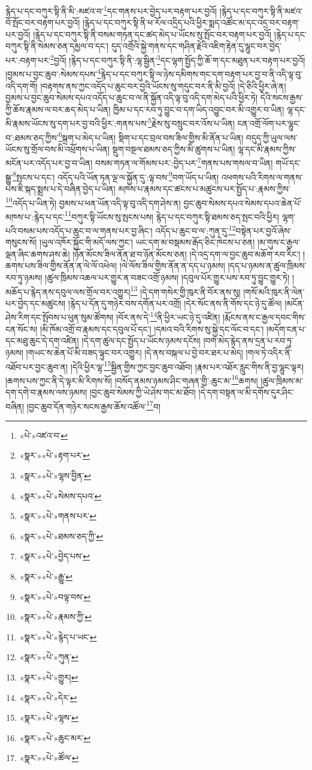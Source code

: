 རྙེད་པ་དང་བཀུར་སྟི་ནི་མི་:མཛའ་བ་\footnote{«པེ་»འཛའ་བ་}དང་གནས་པར་བྱེད་པར་བརྟག་པར་བྱའོ། །རྙེད་པ་དང་བཀུར་སྟི་ནི་མཛའ་བོ་སྤོང་བར་བརྟག་པར་བྱའོ། །རྙེད་པ་དང་བཀུར་སྟི་ནི་ཕ་རོལ་འདྲིད་པའི་ཕྱིར་སྨད་འཚོང་མ་དང་འདྲ་བར་བརྟག་པར་བྱའོ། །རྙེད་པ་དང་བཀུར་སྟི་ནི་བསམ་གཏན་དང་ཚད་མེད་པ་ཡོངས་སུ་སྤོང་བར་བརྟག་པར་བྱའོ། །རྙེད་པ་དང་བཀུར་སྟི་ནི་སེམས་ཅན་དམྱལ་བ་དང་། དུད་འགྲོའི་སྐྱེ་གནས་དང་གཤིན་རྗེའི་འཇིག་རྟེན་དུ་ལྷུང་བར་བྱེད་པར་:བརྟག་པར་\footnote{«སྣར་»«པེ་»རྟག་པར་}བྱའོ། །རྙེད་པ་དང་བཀུར་སྟི་ནི་:ལྷ་སྦྱིན་\footnote{«སྣར་»«པེ་»ལྷས་བྱིན་}དང་ལྷག་སྤྱོད་ཀྱི་ཆོ་ག་དང་མཐུན་པར་བརྟག་པར་བྱའོ། །བྱམས་པ་བྱང་ཆུབ་:སེམས་དཔས་\footnote{«སྣར་»«པེ་»སེམས་དཔའ་}རྙེད་པ་དང་བཀུར་སྟི་ལ་ཉེས་དམིགས་གང་དག་བརྟག་པར་བྱ་བ་ནི་འདི་ལྟ་བུ་འདི་དག་གོ། །བརྟགས་ནས་ཀྱང་འདོད་པ་ཆུང་བར་བྱའི་ཡོངས་སུ་གདུང་བར་ནི་མི་བྱའོ། །དེ་ཅིའི་ཕྱིར་ཞེ་ན། བྱམས་པ་བྱང་ཆུབ་སེམས་དཔའ་འདོད་པ་ཆུང་བ་ལ་ནི་སྐྱོན་འདི་ལྟ་བུ་འདི་དག་མེད་པའི་ཕྱིར་ཏེ། དེའི་སངས་རྒྱས་ཀྱི་ཆོས་རྣམས་ལ་བར་ཆད་མེད་པ་ཡིན། ཁྱིམ་པ་དང་རབ་ཏུ་བྱུང་བ་དག་ཡིད་འབྱུང་བར་མི་འགྱུར་བ་ཡིན། ལྷ་དང་མི་རྣམས་ཡོངས་སུ་དག་པར་བྱ་བའི་ཕྱིར་:གནས་པས་\footnote{«སྣར་»«པེ་»གནས་པར་}རྗེས་སུ་བསྲུང་བར་འོས་པ་ཡིན། ངན་འགྲོ་ལོག་པར་ལྷུང་བ་:ཐམས་ཅད་ཀྱིས་\footnote{«སྣར་»«པེ་»ཐམས་ཅད་ཀྱི་}སྐྲག་པ་མེད་པ་ཡིན། སྡིག་པ་དང་བྲལ་བས་ཟིལ་གྱིས་མི་ནོན་པ་ཡིན། བདུད་ཀྱི་ཡུལ་ལས་ཡོངས་སུ་གྲོལ་བས་མི་འཕྲོགས་པ་ཡིན། སྡུག་བསྔལ་ཐམས་ཅད་ཀྱིས་མི་ཚུགས་པ་ཡིན། ལྷ་དང་མི་རྣམས་ཀྱིས་མངོན་པར་འདོད་པར་བྱ་བ་ཡིན། བསམ་གཏན་ལ་གོམས་པར་:བྱེད་པར་\footnote{«སྣར་»«པེ་»བྱེད་པས་}གནས་པས་གསལ་བ་ཡིན། གཡོ་དང་སྒྱུ་\footnote{«སྣར་»«པེ་»རྒྱུ་}སྤངས་པ་དང་། འདོད་པའི་ཡོན་ཏན་ལྔ་ལ་སྐྱོན་དུ་:ལྟ་བས་\footnote{«སྣར་»«པེ་»བལྟ་བས་}བག་ཡོད་པ་ཡིན། འཕགས་པའི་རིགས་ལ་གནས་པས་ཇི་སྐད་སྨྲས་པ་དེ་བཞིན་བྱེད་པ་ཡིན། མཁས་པ་རྣམས་དང་ཚངས་པ་མཚུངས་པར་སྤྱོད་པ་:རྣམས་ཀྱིས་\footnote{«སྣར་»«པེ་»རྣམས་ཀྱི་}འདོད་པ་ཡིན་ཏེ། བྱམས་པ་ཕན་ཡོན་འདི་ལྟ་བུ་འདི་དག་ཤེས་ན། བྱང་ཆུབ་སེམས་དཔའ་སེམས་དཔའ་ཆེན་པོ་མཁས་པ་:རྙེད་པ་དང་\footnote{«སྣར་»«པེ་»རྙེད་པ་ཡང་}བཀུར་སྟི་ཡོངས་སུ་སྤངས་པས། རྙེད་པ་དང་བཀུར་སྟི་ཐམས་ཅད་སྤང་བའི་ཕྱིར། ལྷག་པའི་བསམ་པས་འདོད་པ་ཆུང་བ་ལ་གནས་པར་བྱ་ཞིང་། འདོད་པ་ཆུང་བ་ལ་:ཀུན་དུ་\footnote{«སྣར་»«པེ་»ཀུན་}བསྟེན་པར་བྱའོ་ཞེས་གསུངས་སོ། །ཡུལ་འཁོར་སྐྱོང་གི་མདོ་ལས་ཀྱང་། ཡང་དག་མ་བསྡམས་རྒོད་ཅིང་ཁེངས་པ་ཅན། །མ་གུས་ང་རྒྱལ་ལྡན་ཞིང་ཆགས་ཤས་ཆེ། །ཉོན་མོངས་ཟིལ་ནོན་ཐ་བ་ཉོན་མོངས་ཅན། །དེ་འདྲ་དག་ལ་བྱང་ཆུབ་མཆོག་རབ་རིང་། །ཆགས་པས་ཟིལ་གྱིས་ནོན་ན་ལེ་ལོ་འཕེལ། །ལེ་ལོས་ཟིལ་གྱིས་ནོན་ན་དད་པ་ཉམས། །དད་པ་ཉམས་ན་ཚུལ་ཁྲིམས་རབ་ཏུ་ཉམས། །ཚུལ་ཁྲིམས་འཆལ་པར་གྱུར་ན་བཟང་འགྲོ་ཉམས། །དབུལ་པོར་གྱུར་པས་རབ་ཏུ་བྱུང་གྱུར་ཏེ། །མཆོད་པ་རྙེད་ནས་དབུལ་ལས་གྲོལ་བར་འགྱུར།\footnote{«སྣར་»«པེ་»གྱུར།} །དེ་དག་གསེར་གྱི་ཁུར་ནི་བོར་ནས་སུ། །གསོ་མའི་ཁུར་ནི་ལེན་པར་བྱེད་དང་མཚུངས། །རྙེད་པ་དོན་དུ་གཉེར་བས་དགོན་པར་འགྲོ། །དེར་སོང་ནས་ནི་གོས་དང་ཉེ་དུ་ཚོལ། །མངོན་ཤེས་རིག་དང་སྤོབས་པ་ཕུན་སུམ་ཚོགས། །བོར་ནས་དེ་\footnote{«སྣར་»«པེ་»དེར་}ནི་ཕྱིར་ཡང་ཉེ་དུ་འཛིན། །རྨོངས་ནས་ང་རྒྱལ་དབང་གིས་ངན་སོང་ས། །མི་ཁོམ་འགྲོ་བ་རྣམས་དང་དབུལ་པོ་དང་། །དམའ་བའི་རིགས་སུ་སྐྱེ་དང་ལོང་བ་དང་། །མདོག་ངན་པ་དང་མཐུ་ཆུང་དེ་དག་འཛིན། །དེ་དག་ཚུལ་དང་སྤྱོད་པ་ཡོངས་ཉམས་དངོས། །བག་མེད་རྙེད་ནས་དྲན་པ་རབ་ཏུ་ཉམས། །གཡང་ས་ཆེན་པོ་མི་བཟད་ལྟུང་བར་འགྱུར། །དེ་ནས་བསྐལ་པ་བྱེ་བར་ཐར་པ་མེད། །གལ་ཏེ་འདིར་ནི་འཐོབ་པར་བྱང་ཆུབ་ན། །དེའི་ཕྱིར་ལྷ་\footnote{«སྣར་»«པེ་»ལྷས་}སྦྱིན་གྱིས་ཀྱང་བྱང་ཆུབ་འཐོབ། །རྣམ་པར་འཐོར་རླུང་གིས་ནི་བྱ་ལྷུང་ལྟར། །ཆགས་པས་ཀྱང་ནི་དེ་ལྟར་མི་རིགས་སོ། །བསོད་ནམས་ཉམས་ཤིང་གཞན་གྱི་:ཆུང་མ་\footnote{«སྣར་»«པེ་»ཆུང་མར་}ཆགས། །ཚུལ་ཁྲིམས་མ་དག་དགེ་བ་རྣམས་ལས་ཉམས། །བྱང་ཆུབ་སེམས་ཀྱི་ཡེ་ཤེས་གང་མ་ཐོབ། །དེ་དག་བསྟན་ལ་མི་དགོས་དུར་ཤིང་བཞིན། །བྱང་ཆུབ་དོན་གཉེར་སངས་རྒྱས་ཆོས་འཚོལ་\footnote{«སྣར་»«པེ་»ཚོལ་}བ། 